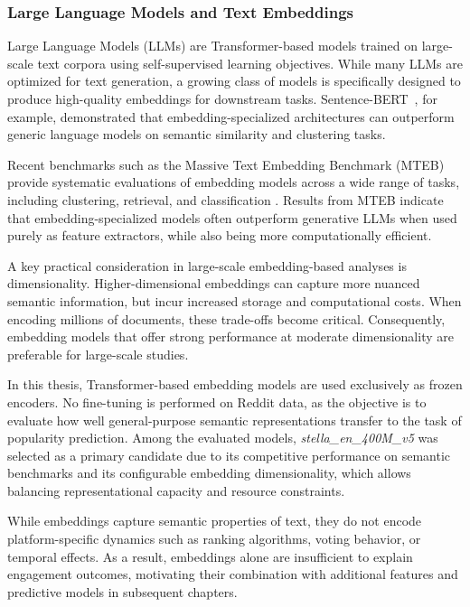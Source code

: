 \subsubsection*{Large Language Models and Text Embeddings}

Large Language Models (LLMs) are Transformer-based models trained on large-scale text corpora using self-supervised learning objectives. While many LLMs are optimized for text generation, a growing class of models is specifically designed to produce high-quality embeddings for downstream tasks. Sentence-BERT~\cite{Reimers2019}, for example, demonstrated that embedding-specialized architectures can outperform generic language models on semantic similarity and clustering tasks.

Recent benchmarks such as the Massive Text Embedding Benchmark (MTEB)\cite{muennighoff2022mteb} provide systematic evaluations of embedding models across a wide range of tasks, including clustering, retrieval, and classification \cite{muennighoff2022mteb}. Results from MTEB indicate that embedding-specialized models often outperform generative LLMs when used purely as feature extractors, while also being more computationally efficient.

A key practical consideration in large-scale embedding-based analyses is dimensionality. Higher-dimensional embeddings can capture more nuanced semantic information, but incur increased storage and computational costs. When encoding millions of documents, these trade-offs become critical. Consequently, embedding models that offer strong performance at moderate dimensionality are preferable for large-scale studies.

In this thesis, Transformer-based embedding models are used exclusively as frozen encoders. No fine-tuning is performed on Reddit data, as the objective is to evaluate how well general-purpose semantic representations transfer to the task of popularity prediction. Among the evaluated models, \textit{stella\_en\_400M\_v5} \cite{stella_en_400M_v5} was selected as a primary candidate due to its competitive performance on semantic benchmarks and its configurable embedding dimensionality, which allows balancing representational capacity and resource constraints.

While embeddings capture semantic properties of text, they do not encode platform-specific dynamics such as ranking algorithms, voting behavior, or temporal effects. As a result, embeddings alone are insufficient to explain engagement outcomes, motivating their combination with additional features and predictive models in subsequent chapters.

